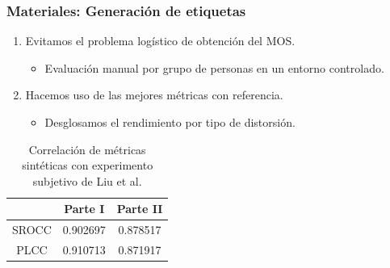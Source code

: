\begin{frame}
  \frametitle{Materiales: Generación de etiquetas}
  \begin{enumerate}
    \item Evitamos el problema logístico de obtención del MOS.
      \begin{itemize}
        \item Evaluación manual por grupo de personas en un entorno controlado.
      \end{itemize}
    \item Hacemos uso de las mejores métricas con referencia.
      \begin{itemize}
        \item Desglosamos el rendimiento por tipo de distorsión.
      \end{itemize}
  \end{enumerate}
\begin{table}
  \centering 
  \scriptsize
  \begin{tabular}{|c|c|c|}
    \hline
    \rowcolor[HTML]{FFC702}
     & \textbf{Parte I} & \textbf{Parte II} \\
    \hline 
    SROCC & 0.902697 & 0.878517\\
    \hline
    PLCC & 0.910713 & 0.871917\\
    \hline
  \end{tabular}
  \caption[Correlación de métricas sintéticas.]{
    Correlación de métricas sintéticas con experimento subjetivo de Liu et al\footnotemark[9].
}
  \label{tab:PseudoCorr}
\end{table}
\end{frame}


